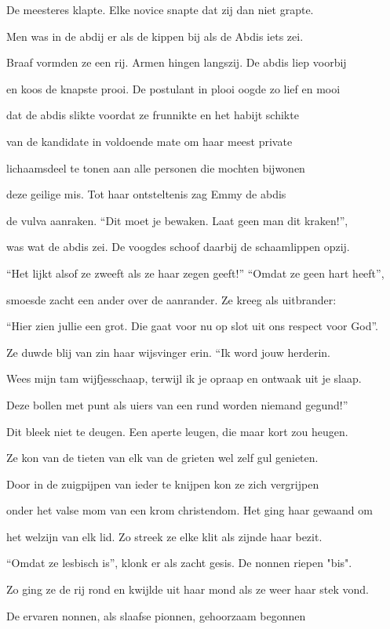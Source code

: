 De meesteres klapte.
Elke novice snapte
dat zij dan niet grapte.

Men was in de abdij
er als de kippen bij
als de Abdis iets zei.

Braaf vormden ze een rij.
Armen hingen langszij.
De abdis liep voorbij

en koos de knapste prooi.
De postulant in plooi
oogde zo lief en mooi

dat de abdis slikte
voordat ze frunnikte
en het habijt schikte

van de kandidate
in voldoende mate
om haar meest private

lichaamsdeel te tonen
aan alle personen
die mochten bijwonen

deze geilige mis.
Tot haar ontsteltenis
zag Emmy de abdis

de vulva aanraken.
“Dit moet je bewaken.
Laat geen man dit kraken!”,

was wat de abdis zei.
De voogdes schoof daarbij
de schaamlippen opzij.

“Het lijkt alsof ze zweeft
als ze haar zegen geeft!”
“Omdat ze geen hart heeft”,

smoesde zacht een ander
over de aanrander.
Ze kreeg als uitbrander:

“Hier zien jullie een grot.
Die gaat voor nu op slot
uit ons respect voor God”.

Ze duwde blij van zin
haar wijsvinger erin.
“Ik word jouw herderin.

Wees mijn tam wijfjesschaap,
terwijl ik je opraap
en ontwaak uit je slaap.

Deze bollen met punt
als uiers van een rund
worden niemand gegund!”

Dit bleek niet te deugen.
Een aperte leugen,
die maar kort zou heugen.

Ze kon van de tieten
van elk van de grieten
wel zelf gul genieten.

Door in de zuigpijpen
van ieder te knijpen
kon ze zich vergrijpen

onder het valse mom
van een krom christendom.
Het ging haar gewaand om

het welzijn van elk lid.
Zo streek ze elke klit
als zijnde haar bezit.

“Omdat ze lesbisch is”,
klonk er als zacht gesis.
De nonnen riepen "bis".

Zo ging ze de rij rond
en kwijlde uit haar mond
als ze weer haar stek vond.

De ervaren nonnen,
als slaafse pionnen,
gehoorzaam begonnen

